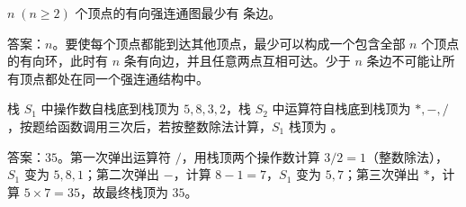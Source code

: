 \begin{question}
$n\;(n\ge2)$ 个顶点的有向强连通图最少有 \blank 条边。
\begin{solution}
答案：$n$。要使每个顶点都能到达其他顶点，最少可以构成一个包含全部 $n$ 个顶点的有向环，此时有 $n$ 条有向边，并且任意两点互相可达。少于 $n$ 条边不可能让所有顶点都处在同一个强连通结构中。
\end{solution}
\end{question}

\begin{question}
栈 $S_1$ 中操作数自栈底到栈顶为 $5,8,3,2$，栈 $S_2$ 中运算符自栈底到栈顶为 $*, -, /$，按题给函数调用三次后，若按整数除法计算，$S_1$ 栈顶为 \blank。
\begin{solution}
答案：$35$。第一次弹出运算符 $/$，用栈顶两个操作数计算 $3/2=1$（整数除法），$S_1$ 变为 $5,8,1$；第二次弹出 $-$，计算 $8-1=7$，$S_1$ 变为 $5,7$；第三次弹出 $*$，计算 $5\times7=35$，故最终栈顶为 $35$。
\end{solution}
\end{question}


